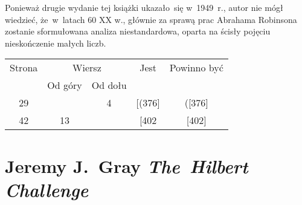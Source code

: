 \documentclass[a4paper,11pt]{article}
\numberwithin{equation}{section}
\begin{document}
\noindent
{} Ponieważ drugie wydanie tej książki ukazało~się w~1949~r.,
autor nie mógł wiedzieć, że~w~latach 60 XX w., głównie za sprawą
prac Abrahama Robinsona zostanie sformułowana analiza niestandardowa,
oparta na ścisły pojęciu nieskończenie małych liczb.





\newpage



\begin{center}

  \begin{tabular}{|c|c|c|c|c|}
    \hline
    Strona & \multicolumn{2}{c|}{Wiersz} & Jest
                              & Powinno być \\ \cline{2-3}
    & Od góry & Od dołu & & \\
    \hline
    29  & &  4 & [(376] & ([376] \\
    42  & 13 & & [402 & [402] \\
    \hline
  \end{tabular}

\end{center}

\VerSpaceTwo


\noindent












\newpage

\section{Jeremy J.~Gray \textit{The~Hilbert Challenge}
  \parencite{Gray-The-Hilbert-Challenge-Pub-2000}}

\label{sec:Gray-The-Hilbert-Challenge}


\end{document}
